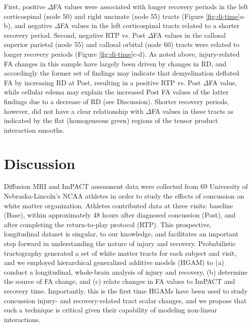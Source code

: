 \documentclass[12pt]{article}
\begin{document}
First, positive $\Delta$FA values were associated with longer recovery periods in the left corticospinal (node 50) and right uncinate (node 55) tracts (Figure \ref{fig:di-time}a-b), and negative $\Delta$FA values in the left corticospinal tracts related to a shorter recovery period. Second, negative RTP vs. Post $\Delta$FA values in the callosal superior parietal (node 55) and callosal orbital (node 60) tracts were related to longer recovery periods (Figure \ref{fig:di-time}c-d). As noted above, injury-related FA changes in this sample have largely been driven by changes in RD, and accordingly the former set of findings may indicate that demyelination deflated FA by increasing RD at Post, resulting in a positive RTP vs. Post $\Delta$FA value, while cellular edema may explain the increased Post FA values of the latter findings due to a decrease of RD (see Discussion). Shorter recovery periods, however, did not have a clear relationship with $\Delta$FA values in these tracts as indicated by the flat (homogeneous green) regions of the tensor product interaction smooths.


\section{Discussion}
\label{sec:disc}
Diffusion MRI and ImPACT assessment data were collected from 69 University of Nebraska-Lincoln's NCAA athletes in order to study the effects of concussion on white matter organization. Athletes contributed data at three visits: baseline (Base), within approximately 48 hours after diagnosed concussion (Post), and after completing the return-to-play protocol (RTP). This prospective, longitudinal dataset is singular, to our knowledge, and facilitates an important step forward in understanding the nature of injury and recovery. Probabilistic tractography generated a set of white matter tracts for each subject and visit, and we employed hierarchical generalized additive models (HGAM) to (a) conduct a longitudinal, whole-brain analysis of injury and recovery, (b) determine the source of FA change, and (c) relate changes in FA values to ImPACT and recovery time. Importantly, this is the first time HGAMs have been used to study concussion injury- and recovery-related tract scalar changes, and we propose that such a technique is critical given their capability of modeling non-linear interactions.

\end{document}
